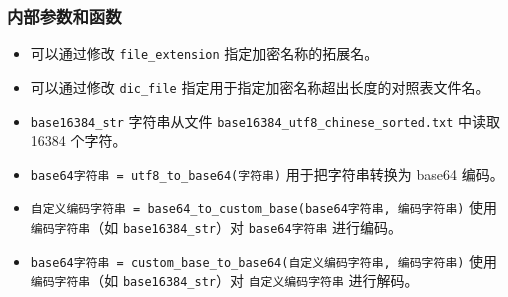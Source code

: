\subsubsection{内部参数和函数}
\begin{itemize}
\item 可以通过修改 \verb`file_extension` 指定加密名称的拓展名。
\item 可以通过修改 \verb`dic_file` 指定用于指定加密名称超出长度的对照表文件名。
\item \verb`base16384_str` 字符串从文件 \verb`base16384_utf8_chinese_sorted.txt` 中读取 16384 个字符。
\item \verb`base64字符串 = utf8_to_base64(字符串)` 用于把字符串转换为 base64 编码。
\item \verb`自定义编码字符串 = base64_to_custom_base(base64字符串, 编码字符串)` 使用 \verb`编码字符串`（如 \verb`base16384_str`）对 \verb`base64字符串` 进行编码。
\item \verb`base64字符串 = custom_base_to_base64(自定义编码字符串, 编码字符串)` 使用 \verb`编码字符串`（如 \verb`base16384_str`）对 \verb`自定义编码字符串` 进行解码。
\end{itemize}
